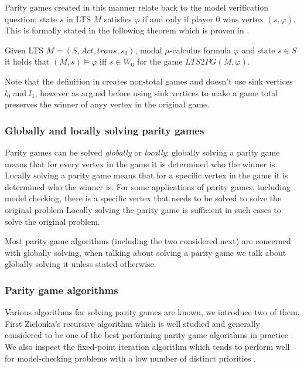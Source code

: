 Parity games created in this manner relate back to the model verification question; state $s$ in LTS $M$ satisfies $\varphi$ if and only if player $0$ wins vertex $(s, \varphi)$. This is formally stated in the following theorem which is proven in \cite{Bradfield2018}.
\begin{theorem}
	\label{the_LTS_PG_REL}Given LTS $M = (S, Act, trans, s_0)$, modal $\mu$-calculus formula $\varphi$ and state $s \in S$ it holds that $(M, s) \models \varphi$ iff $s \in W_0$ for the game $LTS2PG(M, \varphi)$.
\end{theorem}
Note that the definition in \cite{Bradfield2018} creates non-total games and doesn't use sink vertices $l_0$ and $l_1$, however as argued before using sink vertices to make a game total preserves the winner of anyy vertex in the original game.

\subsubsection{Globally and locally solving parity games}
Parity games can be solved \textit{globally} or \textit{locally}; globally solving a parity game means that for every vertex in the game it is determined who the winner is. Locally solving a parity game means that for a specific vertex in the game it is determined who the winner is. For some applications of parity games, including model checking, there is a specific vertex that needs to be solved to solve the original problem Locally solving the parity game is sufficient in such cases to solve the original problem.

Most parity game algorithms (including the two considered next) are concerned with globally solving, when talking about solving a parity game we talk about globally solving it unless stated otherwise. 

\subsubsection{Parity game algorithms}
Various algorithms for solving parity games are known, we introduce two of them. First Zielonka's recursive algorithm which is well studied and generally considered to be one of the best performing parity game algorithms in practice \cite{Oink,SolvingPGInPractice}. We also inspect the fixed-point iteration algorithm which tends to perform well for model-checking problems with a low number of distinct priorities \cite{BDDSolvingPG}.

